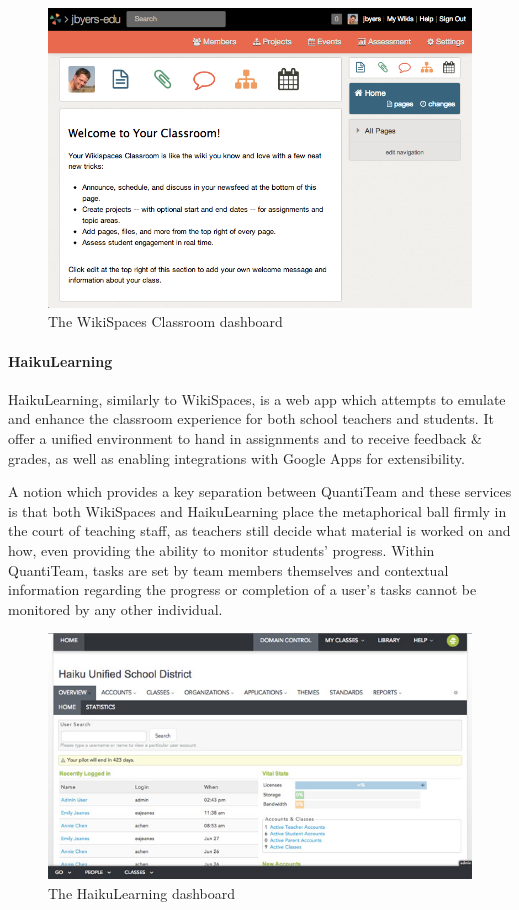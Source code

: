 \documentclass[12pt]{report}
\let\oldparagraph\paragraph
\renewcommand{\paragraph}[1]{\oldparagraph{#1}\mbox{}}
\begin{document}
\begin{figure}[htbp]
\centering
\includegraphics{../screenshots/wikispaces.png}
\caption{The WikiSpaces Classroom dashboard}
\end{figure}

\paragraph{HaikuLearning}\label{haikulearning}

HaikuLearning\cite{haikulearning}, similarly to WikiSpaces, is a web app which attempts to
emulate and enhance the classroom experience for both school teachers
and students. It offer a unified environment to hand in assignments and
to receive feedback \& grades, as well as enabling integrations with
Google Apps for extensibility.

A notion which provides a key separation between QuantiTeam and these
services is that both WikiSpaces and HaikuLearning place the
metaphorical ball firmly in the court of teaching staff, as teachers
still decide what material is worked on and how, even providing the
ability to monitor students' progress. Within QuantiTeam, tasks are set
by team members themselves and contextual information regarding the
progress or completion of a user's tasks cannot be monitored by any
other individual.

\begin{figure}[htbp]
\centering
\includegraphics{../screenshots/haikulearning.jpg}
\caption{The HaikuLearning dashboard}
\end{figure}
\end{document}
